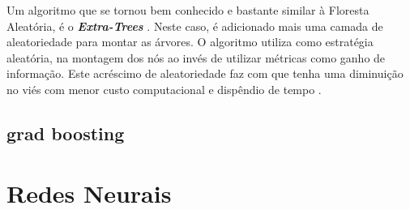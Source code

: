 \documentclass[
]{book}
\begin{document}
Um algoritmo que se tornou bem conhecido e bastante similar à Floresta Aleatória, é o \textbf{\emph{Extra-Trees}} \citep{geurts2006extremely}. Neste caso, é adicionado mais uma camada de aleatoriedade para montar as árvores. O algoritmo utiliza como estratégia aleatória, na montagem dos nós ao invés de utilizar métricas como ganho de informação. Este acréscimo de aleatoriedade faz com que tenha uma diminuição no viés com menor custo computacional e dispêndio de tempo \citep{machado2020avaliaccao}.

\hypertarget{boosting}{%
\section{grad boosting}\label{boosting}}

\hypertarget{redesneurais}{%
\chapter{Redes Neurais}\label{redesneurais}}

  
\end{document}
